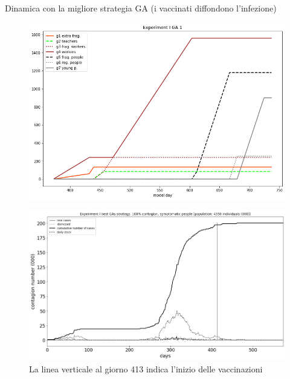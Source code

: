 \documentclass[]{beamer}
\begin{document}
\begin{frame}{Dinamica con la migliore strategia GA (i vaccinati diffondono l'infezione)}

\begin{figure}[H]
\center
\includegraphics[scale=0.16]{Experiment_I_GA_1_VaccinationSequence.png} %

\label{Experiment_I_GA1VaccinationSequence}
\end{figure}

\begin{figure}[H]
\center
\includegraphics[scale=0.16]{Experiment_I_1_GAs_symptomatic_series.png}

\caption{La linea verticale al giorno 413 indica l'inizio delle vaccinazioni}
\label{Experiment_I_GAs1SymptomaticSeries}
\end{figure}


\end{frame}
\end{document}
